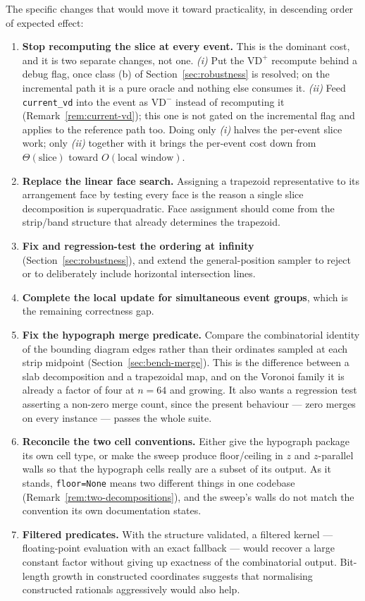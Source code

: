 \documentclass[11pt]{article}
\newcommand{\VD}{\mathrm{VD}}
\begin{document}
The specific changes that would move it toward practicality, in descending
order of expected effect:

\begin{enumerate}
\item \textbf{Stop recomputing the slice at every event.}  This is the dominant
  cost, and it is two separate changes, not one.  \emph{(i)} Put the $\VD^+$
  recompute behind a debug flag, once class (b) of
  Section~\ref{sec:robustness} is resolved; on the incremental path it is a
  pure oracle and nothing else consumes it.  \emph{(ii)} Feed
  \texttt{current\_vd} into the event as $\VD^-$ instead of recomputing it
  (Remark~\ref{rem:current-vd}); this one is not gated on the incremental flag
  and applies to the reference path too.  Doing only \emph{(i)} halves the
  per-event slice work; only \emph{(ii)} together with it brings the per-event
  cost down from $\Theta(\text{slice})$ toward $O(\text{local window})$.
\item \textbf{Replace the linear face search.}  Assigning a trapezoid
  representative to its arrangement face by testing every face is the reason a
  single slice decomposition is superquadratic.  Face assignment should come
  from the strip/band structure that already determines the trapezoid.
\item \textbf{Fix and regression-test the ordering at infinity}
  (Section~\ref{sec:robustness}), and extend the general-position sampler to
  reject or to deliberately include horizontal intersection lines.
\item \textbf{Complete the local update for simultaneous event groups}, which
  is the remaining correctness gap.
\item \textbf{Fix the hypograph merge predicate.}  Compare the combinatorial
  identity of the bounding diagram edges rather than their ordinates sampled at
  each strip midpoint (Section~\ref{sec:bench-merge}).  This is the difference
  between a slab decomposition and a trapezoidal map, and on the Voronoi family
  it is already a factor of four at $n = 64$ and growing.  It also wants a
  regression test asserting a non-zero merge count, since the present behaviour
  --- zero merges on every instance --- passes the whole suite.
\item \textbf{Reconcile the two cell conventions.}  Either give the hypograph
  package its own cell type, or make the sweep produce floor/ceiling in $z$ and
  $z$-parallel walls so that the hypograph cells really are a subset of its
  output.  As it stands, \verb|floor=None| means two different things in one
  codebase (Remark~\ref{rem:two-decompositions}), and the sweep's walls do not
  match the convention its own documentation states.
\item \textbf{Filtered predicates.}  With the structure validated, a filtered
  kernel --- floating-point evaluation with an exact fallback
  \cite{fortune-vanwyk,shewchuk-predicates} --- would recover a large constant
  factor without giving up exactness of the combinatorial output.  Bit-length
  growth in constructed coordinates suggests that normalising constructed
  rationals aggressively would also help.
\end{enumerate}
\end{document}
